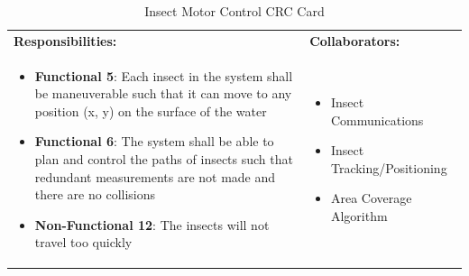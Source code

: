 \documentclass[11pt]{article}
\begin{document}
\begin{table}[H]
\centering
\label{my-label}
\begin{tabular}{ | >{\raggedright\arraybackslash}p{} | >{\raggedright\arraybackslash}p{} | }
\hline
\multicolumn{2}{|c|}{\textbf{Hydroswarm}}             \\ \hline
\textbf{Responsibilities:} & \textbf{Collaborators:} \\ \hline
\begin{itemize}
\item \textbf{Functional 5}: Each insect in the system shall be maneuverable such that it
can move to any position (x, y) on the surface of the water
\item \textbf{Functional 6}: The system shall be able to plan and control the paths of insects
such that redundant measurements are not made and there are no collisions
\item \textbf{Non-Functional 12}: The insects will not travel too quickly
\end{itemize}
&
\begin{itemize}
\item Insect Communications
\item Insect Tracking/Positioning
\item Area Coverage Algorithm
\end{itemize} \\ \hline
\end{tabular}
\caption{Insect Motor Control CRC Card}
\end{table}
\end{document}
